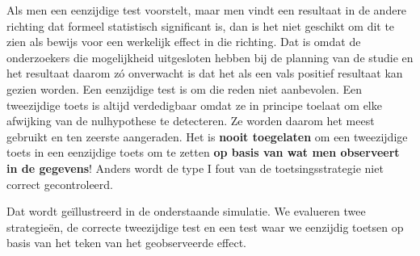 \documentclass[
  12pt,dutch,coursenotes]{book}
\newenvironment{Shaded}{\begin{snugshade}}{\end{snugshade}}
\newcommand{\ControlFlowTok}[1]{\textcolor[rgb]{0.13,0.29,0.53}{\textbf{#1}}}
\newcommand{\DataTypeTok}[1]{\textcolor[rgb]{0.13,0.29,0.53}{#1}}
\newcommand{\DecValTok}[1]{\textcolor[rgb]{0.00,0.00,0.81}{#1}}
\newcommand{\FloatTok}[1]{\textcolor[rgb]{0.00,0.00,0.81}{#1}}
\newcommand{\KeywordTok}[1]{\textcolor[rgb]{0.13,0.29,0.53}{\textbf{#1}}}
\newcommand{\NormalTok}[1]{#1}
\newcommand{\OperatorTok}[1]{\textcolor[rgb]{0.81,0.36,0.00}{\textbf{#1}}}
\newcommand{\StringTok}[1]{\textcolor[rgb]{0.31,0.60,0.02}{#1}}
\theoremstyle{definition}
\theoremstyle{definition}
\theoremstyle{definition}
\theoremstyle{remark}
\begin{document}
Als men een eenzijdige test voorstelt, maar men
vindt een resultaat in de andere richting
dat formeel statistisch significant is, dan is het niet geschikt om dit te
zien als bewijs voor een werkelijk effect in die richting. Dat is omdat de
onderzoekers die mogelijkheid uitgesloten hebben bij de planning van de
studie en het resultaat daarom zó onverwacht is dat het als een vals
positief resultaat kan gezien worden. Een eenzijdige test is om die reden
niet aanbevolen. Een tweezijdige toets is altijd verdedigbaar omdat ze in principe toelaat om elke afwijking van de nulhypothese te detecteren. Ze worden daarom het meest gebruikt en ten zeerste aangeraden.
Het is \textbf{nooit toegelaten} om een tweezijdige toets in een eenzijdige
toets om te zetten \textbf{op basis van wat men observeert in de gegevens}!
Anders wordt de type I fout van de toetsingsstrategie niet correct gecontroleerd.

Dat wordt geïllustreerd in de onderstaande simulatie.
We evalueren twee strategieën, de correcte tweezijdige test en een test waar we eenzijdig toetsen op basis van het teken van het geobserveerde effect.

\begin{Shaded}
\end{Shaded}
\end{document}
